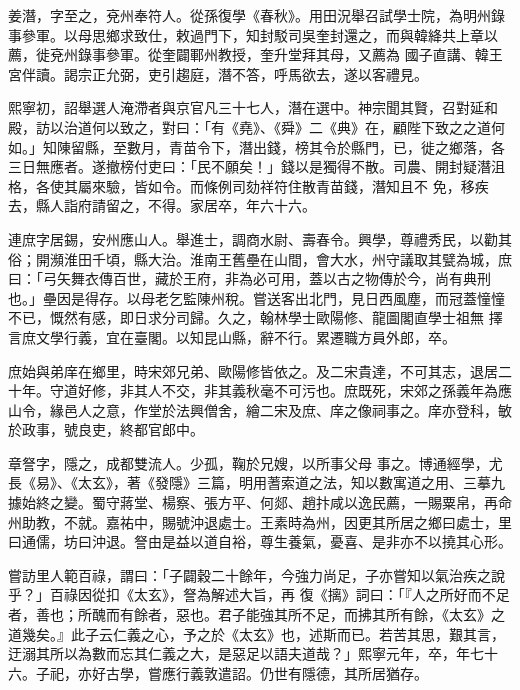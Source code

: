 \begin{pinyinscope}
 姜潛，字至之，兗州奉符人。從孫復學《春秋》。用田況舉召試學士院，為明州錄事參軍。以母思鄉求致仕，敕過門下，知封駁司吳奎封還之，而與韓絳共上章以薦，徙兗州錄事參軍。從奎闢鄆州教授，奎升堂拜其母，又薦為
 國子直講、韓王宮伴讀。謁宗正允弼，吏引趨庭，潛不答，呼馬欲去，遂以客禮見。



 熙寧初，詔舉選人淹滯者與京官凡三十七人，潛在選中。神宗聞其賢，召對延和殿，訪以治道何以致之，對曰：「有《堯》、《舜》二《典》在，顧陛下致之之道何如。」知陳留縣，至數月，青苗令下，潛出錢，榜其令於縣門，已，徙之鄉落，各三日無應者。遂撤榜付吏曰：「民不願矣！」錢以是獨得不散。司農、開封疑潛沮格，各使其屬來驗，皆如令。而條例司劾祥符住散青苗錢，潛知且不
 免，移疾去，縣人詣府請留之，不得。家居卒，年六十六。



 連庶字居錫，安州應山人。舉進士，調商水尉、壽春令。興學，尊禮秀民，以勸其俗；開瀕淮田千頃，縣大治。淮南王舊壘在山間，會大水，州守議取其甓為城，庶曰：「弓矢舞衣傳百世，藏於王府，非為必可用，蓋以古之物傳於今，尚有典刑也。」壘因是得存。以母老乞監陳州稅。嘗送客出北門，見日西風塵，而冠蓋憧憧不已，慨然有感，即日求分司歸。久之，翰林學士歐陽修、龍圖閣直學士祖無
 擇言庶文學行義，宜在臺閣。以知昆山縣，辭不行。累遷職方員外郎，卒。



 庶始與弟庠在鄉里，時宋郊兄弟、歐陽修皆依之。及二宋貴達，不可其志，退居二十年。守道好修，非其人不交，非其義秋毫不可污也。庶既死，宋郊之孫義年為應山令，緣邑人之意，作堂於法興僧舍，繪二宋及庶、庠之像祠事之。庠亦登科，敏於政事，號良吏，終都官郎中。



 章詧字，隱之，成都雙流人。少孤，鞠於兄嫂，以所事父母
 事之。博通經學，尤長《易》、《太玄》，著《發隱》三篇，明用蓍索道之法，知以數寓道之用、三摹九據始終之變。蜀守蔣堂、楊察、張方平、何郯、趙抃咸以逸民薦，一賜粟帛，再命州助教，不就。嘉祐中，賜號沖退處士。王素時為州，因更其所居之鄉曰處士，里曰通儒，坊曰沖退。詧由是益以道自裕，尊生養氣，憂喜、是非亦不以撓其心形。



 嘗訪里人範百祿，謂曰：「子闢穀二十餘年，今強力尚足，子亦嘗知以氣治疾之說乎？」百祿因從扣《太玄》，詧為解述大旨，再
 復《摛》詞曰：「『人之所好而不足者，善也；所醜而有餘者，惡也。君子能強其所不足，而拂其所有餘，《太玄》之道幾矣。』此子云仁義之心，予之於《太玄》也，述斯而已。若苦其思，艱其言，迂溺其所以為數而忘其仁義之大，是惡足以語夫道哉？」熙寧元年，卒，年七十六。子祀，亦好古學，嘗應行義敦遣詔。仍世有隱德，其所居猶存。




\end{pinyinscope}
